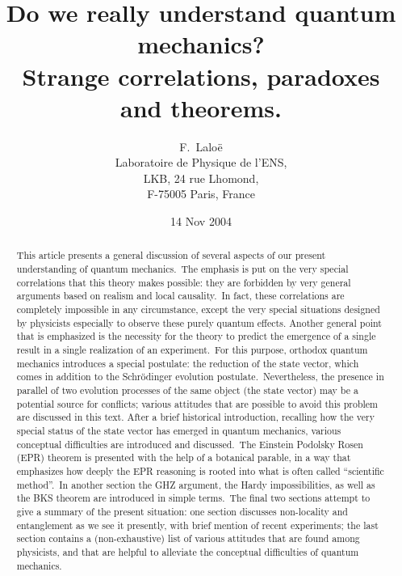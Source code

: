 \documentclass[12pt,onecolumn]{article}%
\begin{document}
\date{14 Nov 2004}
\title{Do we really understand quantum mechanics?\\Strange correlations, paradoxes and theorems.}
\author{F.\ Lalo\"{e}\\Laboratoire de Physique de l'ENS,\\LKB, 24 rue Lhomond,\\F-75005 Paris, France}
\maketitle

\begin{abstract}
This article presents a general discussion of several aspects of our present
understanding of quantum mechanics.\ The emphasis is put on the very special
correlations that this theory makes possible: they are forbidden by very
general arguments based on realism and local causality.\ In fact, these
correlations are completely impossible in any circumstance, except the very
special situations designed by physicists especially to observe these purely
quantum effects. Another general point that is emphasized is the necessity for
the theory to predict the emergence of a single result in a single realization
of an experiment.\ For this purpose, orthodox quantum mechanics introduces a
special postulate: the reduction of the state vector, which comes in addition
to the Schr\"{o}dinger evolution postulate.\ Nevertheless, the presence in
parallel of two evolution processes of the same object (the state vector) may
be a potential source for conflicts; various attitudes that are possible to
avoid this problem are discussed in this text. After a brief historical
introduction, recalling how the very special status of the state vector has
emerged in quantum mechanics, various conceptual difficulties are introduced
and discussed.\ The Einstein Podolsky Rosen (EPR) theorem is presented with
the help of a botanical parable, in a way that emphasizes how deeply the EPR
reasoning is rooted into what is often called ``scientific method''.\ In
another section the GHZ argument, the Hardy impossibilities, as well as the
BKS theorem are introduced in simple terms.\ The final two sections attempt to
give a summary of the present situation: one section discusses non-locality
and entanglement as we see it presently, with brief mention of recent
experiments; the last section contains a (non-exhaustive) list of various
attitudes that are found among physicists, and that are helpful to alleviate
the conceptual difficulties of quantum mechanics.

\end{abstract}
\end{document}
